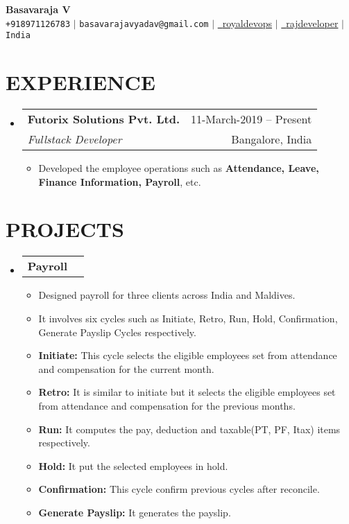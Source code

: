 \documentclass[letterpaper,11pt]{article}
\makeatletter
\newcommand{\resumeItem}[1]{
  \item\small{
    {#1 \vspace{-1pt}}
  }
}
\newcommand{\resumeSubheading}[4]{
  \vspace{-1pt}\item
    \begin{tabular*}{\textwidth}[t]{l@{\extracolsep{\fill}}r}
      \textbf{#1} & {\color{dark-grey}\small #2}\vspace{1pt}\\ %
      \textit{#3} & {\color{dark-grey} \small #4}\\ %
    \end{tabular*}\vspace{-4pt}
}
\newcommand{\resumeProjectHeading}[2]{
    \item
    \begin{tabular*}{\textwidth}{l@{\extracolsep{\fill}}r}
      #1 & {\color{dark-grey}} \\
    \end{tabular*}\vspace{-4pt}
}
\newcommand{\resumeSubHeadingListStart}{\begin{itemize}[leftmargin=0in, label={}]}
\newcommand{\resumeSubHeadingListEnd}{\end{itemize}}
\newcommand{\resumeItemListStart}{\begin{itemize}}
\newcommand{\resumeItemListEnd}{\end{itemize}\vspace{0pt}}
\makeatother
\begin{document}
\begin{center}
    \textbf{\Huge Basavaraja V} \\ \vspace{5pt}
    \small \faPhone* \texttt{+918971126783} \hspace{1pt} $|$
    \hspace{1pt} \faEnvelope \hspace{2pt} \texttt{basavarajavyadav@gmail.com} \hspace{1pt} $|$ 
    \href{https://linkedin.com/in//}{\raisebox{-0.2\height}\faLinkedin\ {royaldevops}} $|$
    \href{https://github.com/}{\raisebox{-0.2\height}\faGithub\ {rajdeveloper}} $|$
    \hspace{1pt} \faMapMarker* \hspace{2pt}\texttt{India}
    \\ \vspace{-3pt}
\end{center}

\section{EXPERIENCE}
  \resumeSubHeadingListStart

    \resumeSubheading
      {Futorix Solutions Pvt. Ltd.}{11-March-2019 -- Present}
      {Fullstack Developer}{Bangalore, India}
      \resumeItemListStart
        \resumeItem{Developed the employee operations such as \textbf{Attendance, Leave, Finance Information, Payroll}, etc.}
      \resumeItemListEnd
  \resumeSubHeadingListEnd


\section{PROJECTS}
    \resumeSubHeadingListStart
      \resumeProjectHeading
          {\textbf{Payroll}} {}
          \resumeItemListStart
            \resumeItem{Designed payroll for three clients across India and Maldives.}
            \resumeItem{It involves six cycles such as Initiate, Retro, Run, Hold, Confirmation, Generate Payslip Cycles respectively.}
            \resumeItem{\textbf{Initiate:} This cycle selects the eligible employees set from attendance and compensation for the current month.}
            \resumeItem{\textbf{Retro:} It is similar to initiate but it selects the eligible employees set from attendance and compensation for the previous months.}
            \resumeItem{\textbf{Run:} It computes the pay, deduction and taxable(PT, PF, Itax) items respectively.}
            \resumeItem{\textbf{Hold:} It put the selected employees in hold.}
            \resumeItem{\textbf{Confirmation:} This cycle confirm previous cycles after reconcile.}
            \resumeItem{\textbf{Generate Payslip:} It generates the payslip.}
          \resumeItemListEnd
    \resumeSubHeadingListEnd
\end{document}
